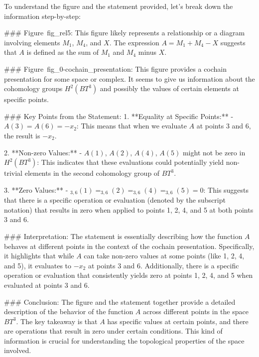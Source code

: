 To understand the figure and the statement provided, let's break down the information step-by-step:

### Figure~fig_rel5:
This figure likely represents a relationship or a diagram involving elements \( M_1 \), \( M_4 \), and \( X \). The expression \( A = M_1 + M_4 - X \) suggests that \( A \) is defined as the sum of \( M_1 \) and \( M_4 \) minus \( X \).

### Figure~fig_0-cochain_presentation:
This figure provides a cochain presentation for some space or complex. It seems to give us information about the cohomology groups \( H^2(BT^3) \) and possibly the values of certain elements at specific points.

### Key Points from the Statement:
1. **Equality at Specific Points:**
   - \( A(3) = A(6) = -x_2 \): This means that when we evaluate \( A \) at points 3 and 6, the result is \(-x_2\).
   
2. **Non-zero Values:**
   - \( A(1) \), \( A(2) \), \( A(4) \), \( A(5) \) might not be zero in \( H^2(BT^3) \): This indicates that these evaluations could potentially yield non-trivial elements in the second cohomology group of \( BT^3 \).

3. **Zero Values:**
   - \( _{3,6}(1) = _{3,6}(2) = _{3,6}(4) = _{3,6}(5) = 0 \): This suggests that there is a specific operation or evaluation (denoted by the subscript notation) that results in zero when applied to points 1, 2, 4, and 5 at both points 3 and 6.

### Interpretation:
The statement is essentially describing how the function \( A \) behaves at different points in the context of the cochain presentation. Specifically, it highlights that while \( A \) can take non-zero values at some points (like 1, 2, 4, and 5), it evaluates to \(-x_2\) at points 3 and 6. Additionally, there is a specific operation or evaluation that consistently yields zero at points 1, 2, 4, and 5 when evaluated at points 3 and 6.

### Conclusion:
The figure and the statement together provide a detailed description of the behavior of the function \( A \) across different points in the space \( BT^3 \). The key takeaway is that \( A \) has specific values at certain points, and there are operations that result in zero under certain conditions. This kind of information is crucial for understanding the topological properties of the space involved.